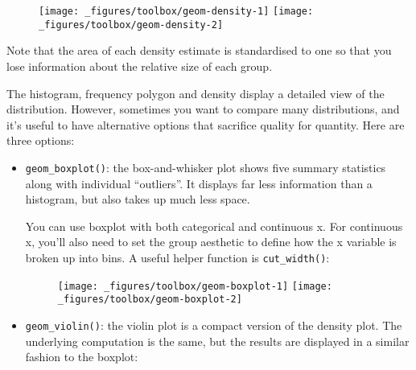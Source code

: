 \begin{figure}[H]
  \texttt{[image: \_figures/toolbox/geom-density-1]}%
  \texttt{[image: \_figures/toolbox/geom-density-2]}
\end{figure}

Note that the area of each density estimate is standardised to one so
that you lose information about the relative size of each group.

The histogram, frequency polygon and density display a detailed view of
the distribution. However, sometimes you want to compare many
distributions, and it's useful to have alternative options that
sacrifice quality for quantity. Here are three options:

\begin{itemize}
\item
  \texttt{geom\_boxplot()}: the box-and-whisker plot shows five summary
  statistics along with individual ``outliers''. It displays far less
  information than a histogram, but also takes up much less space.
   

  You can use boxplot with both categorical and continuous x. For
  continuous x, you'll also need to set the group aesthetic to define
  how the x variable is broken up into bins. A useful helper function is
  \texttt{cut\_width()}: 

\begin{Shaded}
\begin{Highlighting}[]
\StringTok{ }
\StringTok{  }\NormalTok{()}
\StringTok{ }
\StringTok{  }\NormalTok{(}\NormalTok{(} \NormalTok{))) +}\StringTok{ }
\StringTok{  }\NormalTok{(}\NormalTok{, }\NormalTok{)}
\end{Highlighting}
\end{Shaded}

  \begin{figure}[H]
    \texttt{[image: \_figures/toolbox/geom-boxplot-1]}%
    \texttt{[image: \_figures/toolbox/geom-boxplot-2]}
  \end{figure}
\item
  \texttt{geom\_violin()}: the violin plot is a compact version of the
  density plot. The underlying computation is the same, but the results
  are displayed in a similar fashion to the boxplot:
   


\end{itemize}

